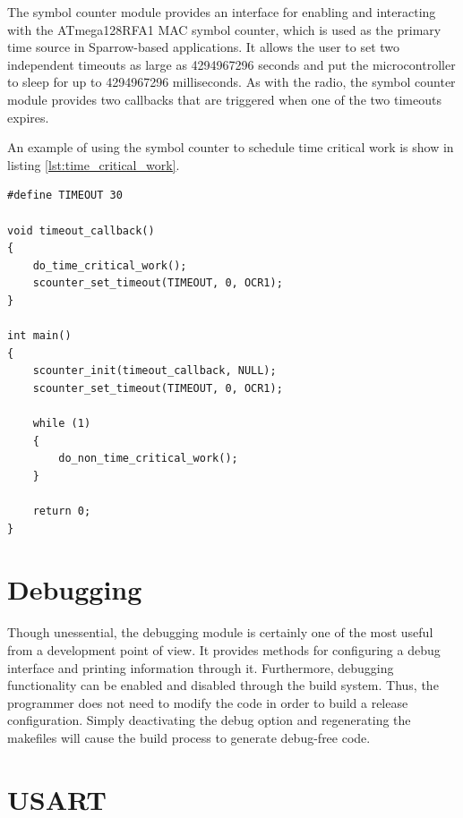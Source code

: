 The symbol counter module provides an interface for enabling and interacting
with the \mbox{ATmega128RFA1} MAC symbol counter, which is used as the primary
time source in Sparrow-based applications. It allows the user to set two
independent timeouts as large as 4294967296 seconds and put the microcontroller
to sleep for up to 4294967296 milliseconds. As with the radio, the symbol
counter module provides two callbacks that are triggered when one of the two
timeouts expires.

An example of using the symbol counter to schedule time critical work is show
in listing \ref{lst:time_critical_work}.

\lstset{
	language=C, numbers=none, caption=Time critical work snippet,
	label=lst:time_critical_work
}
\begin{lstlisting}
#define TIMEOUT	30

void timeout_callback()
{
	do_time_critical_work();
	scounter_set_timeout(TIMEOUT, 0, OCR1);
}

int main()
{
	scounter_init(timeout_callback, NULL);
	scounter_set_timeout(TIMEOUT, 0, OCR1);

	while (1)
	{
		do_non_time_critical_work();
	}

	return 0;
}
\end{lstlisting}

\section{Debugging}

Though unessential, the debugging module is certainly one of the most useful
from a development point of view. It provides methods for configuring a debug
interface and printing information through it. Furthermore, debugging
functionality can be enabled and disabled through the build system. Thus, the
programmer does not need to modify the code in order to build a release
configuration. Simply deactivating the debug option and regenerating the
makefiles will cause the build process to generate debug-free code.

\section{USART}

\todo{}

